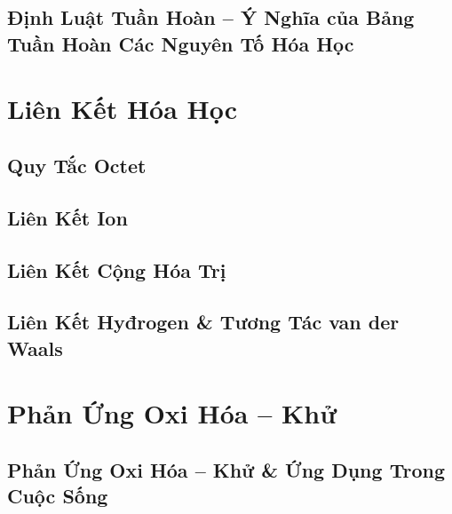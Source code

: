 \documentclass[oneside]{book}
\numberwithin{equation}{section}
\begin{document}

\section{Định Luật Tuần Hoàn -- Ý Nghĩa của Bảng Tuần Hoàn Các Nguyên Tố Hóa Học}


\chapter{Liên Kết Hóa Học}

\section{Quy Tắc Octet}


\section{Liên Kết Ion}


\section{Liên Kết Cộng Hóa Trị}


\section{Liên Kết Hyđrogen \& Tương Tác van der Waals}


\chapter{Phản Ứng Oxi Hóa -- Khử}

\section{Phản Ứng Oxi Hóa -- Khử \& Ứng Dụng Trong Cuộc Sống}
\end{document}
